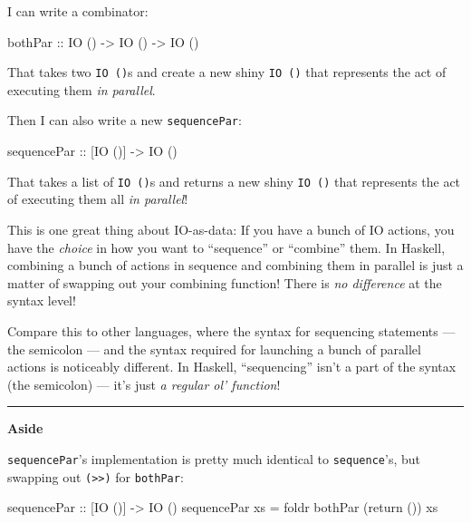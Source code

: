 \documentclass[]{article}
\newenvironment{Shaded}{\begin{snugshade}}{\end{snugshade}}
\newcommand{\DataTypeTok}[1]{\textcolor[rgb]{0.13,0.29,0.53}{#1}}
\newcommand{\FunctionTok}[1]{\textcolor[rgb]{0.00,0.00,0.00}{#1}}
\newcommand{\NormalTok}[1]{#1}
\newcommand{\OtherTok}[1]{\textcolor[rgb]{0.56,0.35,0.01}{#1}}
\begin{document}
I can write a combinator:

\begin{Shaded}
\begin{Highlighting}[]
\OtherTok{bothPar ::} \DataTypeTok{IO}\NormalTok{ () }\OtherTok{->} \DataTypeTok{IO}\NormalTok{ () }\OtherTok{->} \DataTypeTok{IO}\NormalTok{ ()}
\end{Highlighting}
\end{Shaded}

That takes two \texttt{IO\ ()}s and create a new shiny \texttt{IO\ ()} that
represents the act of executing them \emph{in parallel}.

Then I can also write a new \texttt{sequencePar}:

\begin{Shaded}
\begin{Highlighting}[]
\OtherTok{sequencePar ::}\NormalTok{ [}\DataTypeTok{IO}\NormalTok{ ()] }\OtherTok{->} \DataTypeTok{IO}\NormalTok{ ()}
\end{Highlighting}
\end{Shaded}

That takes a list of \texttt{IO\ ()}s and returns a new shiny \texttt{IO\ ()}
that represents the act of executing them all \emph{in parallel}!

This is one great thing about IO-as-data: If you have a bunch of IO actions, you
have the \emph{choice} in how you want to ``sequence'' or ``combine'' them. In
Haskell, combining a bunch of actions in sequence and combining them in parallel
is just a matter of swapping out your combining function! There is \emph{no
difference} at the syntax level!

Compare this to other languages, where the syntax for sequencing statements ---
the semicolon --- and the syntax required for launching a bunch of parallel
actions is noticeably different. In Haskell, ``sequencing'' isn't a part of the
syntax (the semicolon) --- it's just \emph{a regular ol' function}!

\begin{center}\rule{0.5\linewidth}{\linethickness}\end{center}

\textbf{Aside}

\texttt{sequencePar}'s implementation is pretty much identical to
\texttt{sequence}'s, but swapping out \texttt{(\textgreater{}\textgreater{})}
for \texttt{bothPar}:

\begin{Shaded}
\begin{Highlighting}[]
\OtherTok{sequencePar ::}\NormalTok{ [}\DataTypeTok{IO}\NormalTok{ ()] }\OtherTok{->} \DataTypeTok{IO}\NormalTok{ ()}
\NormalTok{sequencePar xs }\FunctionTok{=}\NormalTok{ foldr bothPar (return ()) xs}
\end{Highlighting}
\end{Shaded}
\end{document}

